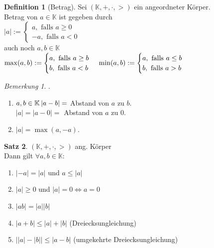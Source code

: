 \documentclass[12pt,a4paper,titlepage]{article} %
\theoremstyle{definition}
\newtheorem{satz}{Satz}[subsection]
\newtheorem{defi}[satz]{Definition}
\theoremstyle{remark}
\newtheorem*{bem}{Bemerkung}
\begin{document}
\begin{defi}[Betrag]
	Sei $(\mathbb{K}, +,\cdot,>)$ ein angeordneter Körper.\\
	Betrag von $a\in\mathbb{K}$ ist gegeben durch\\
	$\left| a\right| := 
	\begin{cases}
		a, \text{ falls } a\geq 0\\
		-a, \text{ falls }a<0
	\end{cases}$\\
	auch noch $a,b\in \mathbb{K}$\\
	$\max(a,b) := 
	\begin{cases}
		a, \text{ falls } a\geq b\\
		b, \text{ falls } a < b
	\end{cases}\\
	\min(a,b) := 
	\begin{cases}
		a, \text{ falls } a\leq b\\
		b, \text{ falls } a > b
	\end{cases}$\\
\end{defi}
\begin{bem} . %
	\begin{enumerate}
		\item $a,b\in \mathbb{K}\\
		\left| a-b\right| = $ Abstand von $a$ zu $b$.\\
		$\left| a\right| = \left| a-0\right| = $ Abstand von $a$ zu $0$.
		\item $\left| a\right| = \max(a, -a)$.
	\end{enumerate}
\end{bem}
\begin{satz}
	$(\mathbb{K},+,\cdot,>)$ ang. Körper\\
	Dann gilt $\forall a,b\in\mathbb{K}:$
	\begin{enumerate}
		\item $\left|-a\right| = \left| a\right|$ und $a\leq\left|a\right|$
		\item $\left| a\right| \geq 0$ und $\left| a\right| = 0 \Leftrightarrow a = 0$
		\item $\left| ab\right| = \left| a\right| \left| b\right|$
		\item $\left| a+b\right| \leq \left| a\right| + \left|b\right|$ (Dreiecksungleichung)
		\item $\left|\left|a\right|-\left|b\right|\right| \leq \left| a-b\right|$ (umgekehrte Dreiecksungleichung)
	\end{enumerate}
\end{satz}
\end{document}
